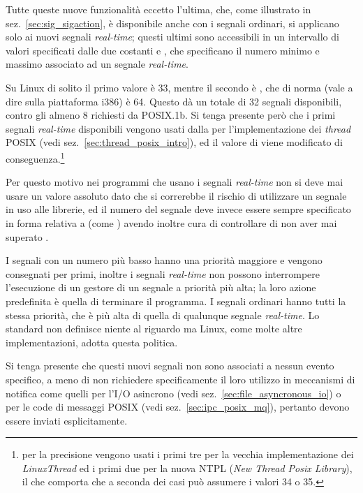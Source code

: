 Tutte queste nuove funzionalità eccetto l'ultima, che, come illustrato in
sez.~\ref{sec:sig_sigaction}, è disponibile anche con i segnali ordinari, si
applicano solo ai nuovi segnali \textit{real-time}; questi ultimi sono
accessibili in un intervallo di valori specificati dalle due costanti
 e , che specificano il numero minimo e
massimo associato ad un segnale \textit{real-time}.

Su Linux di solito il primo valore è 33, mentre il secondo è ,
che di norma (vale a dire sulla piattaforma i386) è 64. Questo dà un totale di
32 segnali disponibili, contro gli almeno 8 richiesti da POSIX.1b. Si tenga
presente però che i primi segnali \textit{real-time} disponibili vengono usati
dalla  per l'implementazione dei \textit{thread} POSIX (vedi
sez.~\ref{sec:thread_posix_intro}), ed il valore di  viene
modificato di conseguenza.\footnote{per la precisione vengono usati i primi
  tre per la vecchia implementazione dei \textit{LinuxThread} ed i primi due
  per la nuova NTPL (\textit{New Thread Posix Library}), il che comporta che
   a seconda dei casi può assumere i valori 34 o 35.}

Per questo motivo nei programmi che usano i segnali \textit{real-time} non si
deve mai usare un valore assoluto dato che si correrebbe il rischio di
utilizzare un segnale in uso alle librerie, ed il numero del segnale deve
invece essere sempre specificato in forma relativa a  (come
) avendo inoltre cura di controllare di non aver mai
superato .

I segnali con un numero più basso hanno una priorità maggiore e vengono
consegnati per primi, inoltre i segnali \textit{real-time} non possono
interrompere l'esecuzione di un gestore di un segnale a priorità più alta; la
loro azione predefinita è quella di terminare il programma.  I segnali
ordinari hanno tutti la stessa priorità, che è più alta di quella di qualunque
segnale \textit{real-time}. Lo standard non definisce niente al riguardo ma
Linux, come molte altre implementazioni, adotta questa politica.

Si tenga presente che questi nuovi segnali non sono associati a nessun evento
specifico, a meno di non richiedere specificamente il loro utilizzo in
meccanismi di notifica come quelli per l'I/O asincrono (vedi
sez.~\ref{sec:file_asyncronous_io}) o per le code di messaggi POSIX (vedi
sez.~\ref{sec:ipc_posix_mq}), pertanto devono essere inviati esplicitamente.

